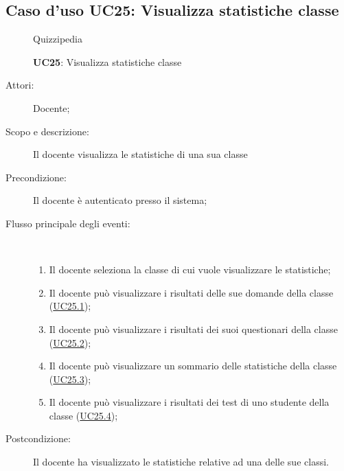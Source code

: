 \subsection{Caso d'uso UC25: Visualizza statistiche classe}
\begin{figure}[H]
	\centering
	\begin{resizedtikzpicture}{\textwidth}
		\begin{umlsystem}[x=0, fill=lightgray!20]{Quizzipedia}
		\end{umlsystem}
	\end{resizedtikzpicture}
	\caption{\textbf{UC25}: Visualizza statistiche classe}
	\label{UC25}
\end{figure}
\begin{description}
	\item[Attori:] Docente;
	\item[Scopo e descrizione:] Il docente visualizza le statistiche di una sua classe
	\item[Precondizione:] Il docente è autenticato presso il sistema;
	
	\item[Flusso principale degli eventi:] \ 
	\begin{enumerate}
		\item Il docente seleziona la classe di cui vuole visualizzare le statistiche;
		\item Il docente può visualizzare i risultati delle sue domande della classe (\hyperlink{UC25.1}{UC25.1});
		\item Il docente può visualizzare i risultati dei suoi questionari della classe (\hyperlink{UC25.2}{UC25.2});
		\item Il docente può visualizzare un sommario delle statistiche della classe (\hyperlink{UC25.3}{UC25.3});
		\item Il docente può visualizzare i risultati dei test di uno studente della classe (\hyperlink{UC25.4}{UC25.4});
		
	\end{enumerate}
	\item[Postcondizione:] Il docente ha visualizzato le statistiche relative ad una delle sue classi.
\end{description}
\hypertarget{UC25.1}{}
